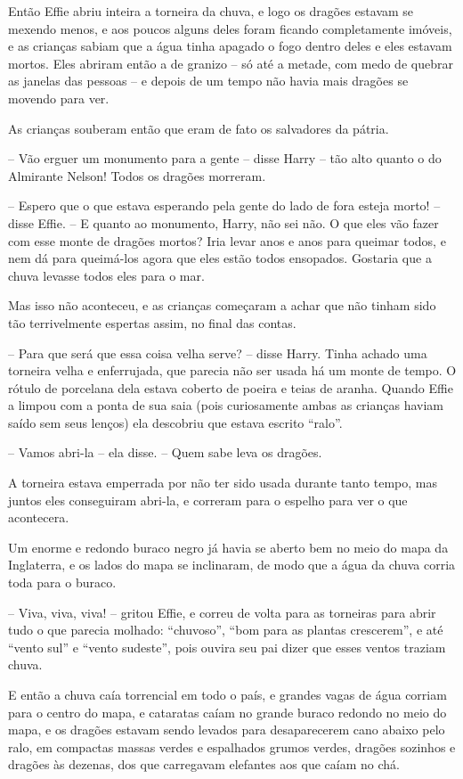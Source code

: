 Então Effie abriu inteira a torneira da chuva, e logo os dragões
estavam se mexendo menos, e aos poucos alguns deles foram ficando
completamente imóveis, e as crianças sabiam que a água tinha apagado
o fogo dentro deles e eles estavam mortos. Eles abriram então a de
granizo -- só até a metade, com medo de quebrar as janelas das pessoas
-- e depois de um tempo não havia mais dragões se movendo para ver.

As crianças souberam então que eram de fato os salvadores da pátria.

-- Vão erguer um monumento para a gente -- disse Harry -- tão alto quanto
o do Almirante Nelson! Todos os dragões morreram.

-- Espero que o que estava esperando pela gente do lado de fora esteja
morto! -- disse Effie. -- E quanto ao monumento, Harry, não sei não. O
que eles vão fazer com esse monte de dragões mortos? Iria levar anos
e anos para queimar todos, e nem dá para queimá-los agora que eles
estão todos ensopados. Gostaria que a chuva levasse todos eles para o
mar.

Mas isso não aconteceu, e as crianças começaram a achar que não tinham
sido tão terrivelmente espertas assim, no final das contas.

-- Para que será que essa coisa velha serve? -- disse Harry. Tinha
achado uma torneira velha e enferrujada, que parecia não ser usada há
um monte de tempo. O rótulo de porcelana dela estava coberto de
poeira e teias de aranha. Quando Effie a limpou com a ponta de sua
saia (pois curiosamente ambas as crianças haviam saído sem seus
lenços) ela descobriu que estava escrito “ralo”.

-- Vamos abri-la -- ela disse. -- Quem sabe leva os dragões.

A torneira estava emperrada por não ter sido usada durante tanto
tempo, mas juntos eles conseguiram abri-la, e correram para o espelho
para ver o que acontecera.

Um enorme e redondo buraco negro já havia se aberto bem no meio do
mapa da Inglaterra, e os lados do mapa se inclinaram, de modo que a
água da chuva corria toda para o buraco.

-- Viva, viva, viva! -- gritou Effie, e correu de volta para as
torneiras para abrir tudo o que parecia molhado: “chuvoso”, “bom para
as plantas crescerem”, e até “vento sul” e “vento sudeste”, pois
ouvira seu pai dizer que esses ventos traziam chuva.

E então a chuva caía torrencial em todo o país, e grandes vagas de
água corriam para o centro do mapa, e cataratas caíam no grande
buraco redondo no meio do mapa, e os dragões estavam sendo levados
para desaparecerem cano abaixo pelo ralo, em compactas massas verdes
e espalhados grumos verdes, dragões sozinhos e dragões às dezenas,
dos que carregavam elefantes aos que caíam no chá.

